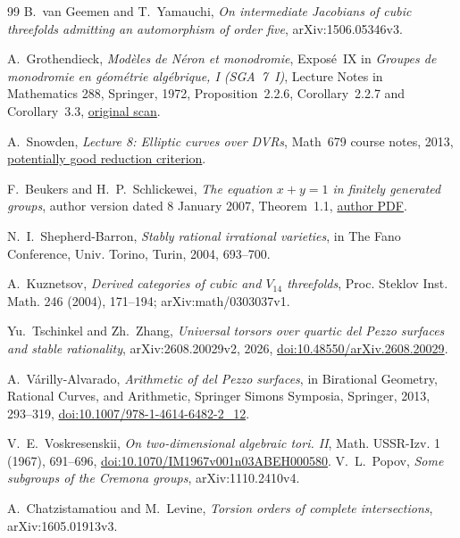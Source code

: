 \documentclass[11pt]{article}
\theoremstyle{remark}
\begin{document}
\begin{thebibliography}{99}
 B.~van Geemen and T.~Yamauchi,
\emph{On intermediate Jacobians of cubic threefolds admitting an
automorphism of order five}, arXiv:1506.05346v3.

 A.~Grothendieck,
\emph{Mod\`eles de N\'eron et monodromie}, Expos\'e~IX in
\emph{Groupes de monodromie en g\'eom\'etrie alg\'ebrique, I (SGA~7~I)},
Lecture Notes in Mathematics 288, Springer, 1972,
Proposition~2.2.6, Corollary~2.2.7 and Corollary~3.3,
\href{https://library.slmath.org/nonmsri/sga/sga/pdf/sga7-1.pdf}{original scan}.

 A.~Snowden,
\emph{Lecture 8: Elliptic curves over DVRs}, Math~679 course notes, 2013,
\href{https://websites.umich.edu/~asnowden/teaching/2013/679/L08.html}
{potentially good reduction criterion}.

 F.~Beukers and H.~P.~Schlickewei,
\emph{The equation \(x+y=1\) in finitely generated groups},
author version dated 8 January 2007, Theorem~1.1,
\href{https://webspace.science.uu.nl/~beuke106/s-units.pdf}{author PDF}.

 N.~I.~Shepherd-Barron,
\emph{Stably rational irrational varieties},
in The Fano Conference, Univ. Torino, Turin, 2004, 693--700.

 A.~Kuznetsov,
\emph{Derived categories of cubic and \(V_{14}\) threefolds},
Proc. Steklov Inst. Math. 246 (2004), 171--194; arXiv:math/0303037v1.

 Yu.~Tschinkel and Zh.~Zhang,
\emph{Universal torsors over quartic del Pezzo surfaces and stable
rationality}, arXiv:2608.20029v2, 2026,
\href{https://doi.org/10.48550/arXiv.2608.20029}
{doi:10.48550/arXiv.2608.20029}.

 A.~V\'arilly-Alvarado,
\emph{Arithmetic of del Pezzo surfaces},
in Birational Geometry, Rational Curves, and Arithmetic,
Springer Simons Symposia, Springer, 2013, 293--319,
\href{https://doi.org/10.1007/978-1-4614-6482-2_12}
{doi:10.1007/978-1-4614-6482-2\_12}.

 V.~E.~Voskresenskii,
\emph{On two-dimensional algebraic tori. II},
Math. USSR-Izv. 1 (1967), 691--696,
\href{https://doi.org/10.1070/IM1967v001n03ABEH000580}
{doi:10.1070/IM1967v001n03ABEH000580}.
V.~L.~Popov,
\emph{Some subgroups of the Cremona groups}, arXiv:1110.2410v4.

A.~Chatzistamatiou and M.~Levine,
\emph{Torsion orders of complete intersections}, arXiv:1605.01913v3.

\end{thebibliography}
\endgroup
\end{document}
